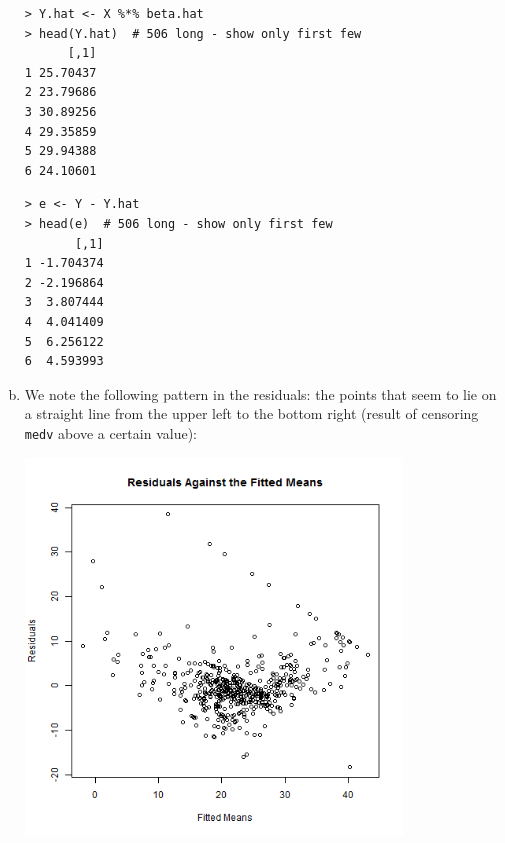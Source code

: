 \documentclass[paper=a4, fontsize=11pt]{scrartcl} %
\begin{document}
\begin{enumerate}[(a)]
\begin{lstlisting}[basicstyle=\ttfamily\small\bfseries]
> Y.hat <- X %*% beta.hat
> head(Y.hat)  # 506 long - show only first few
      [,1]
1 25.70437
2 23.79686
3 30.89256
4 29.35859
5 29.94388
6 24.10601
\end{lstlisting}

\begin{lstlisting}[basicstyle=\ttfamily\small\bfseries]
> e <- Y - Y.hat
> head(e)  # 506 long - show only first few
       [,1]
1 -1.704374
2 -2.196864
3  3.807444
4  4.041409
5  6.256122
6  4.593993
\end{lstlisting}
\pagebreak
\item We note the following pattern in the residuals: the points that seem to lie on a straight line from the upper left to the bottom right (result of censoring \texttt{medv} above a certain value):
   
 \begin{center} 
\includegraphics[width=10cm, height=10cm, width= 10cm]{resids_d}
\end{center} 


\end{enumerate}
\end{document}
